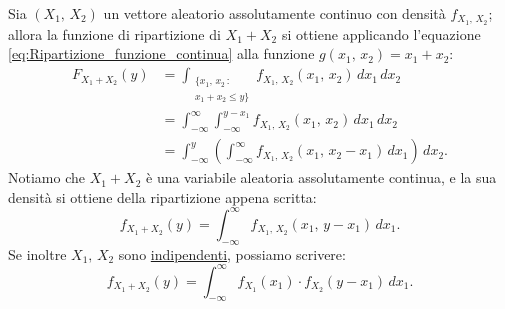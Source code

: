         \begin{prty}
            Sia $(X_1,\, X_2)$ un vettore aleatorio assolutamente continuo con densità $f_{X_1,\,X_2}$; allora la funzione di ripartizione di $X_1 + X_2$ si ottiene applicando l'equazione \eqref{eq:Ripartizione_funzione_continua} alla funzione $g(x_1,\, x_2)=x_1+x_2$:
            \begin{align*}
                F_{X_1+X_2}(y) &= \int_{\substack{\{x_1,\,x_2\,:\\
                x_1+x_2 \leq y\}}} f_{X_1,\,X_2}(x_1,\,x_2)\, dx_1\, dx_2 \\
                               &= \int_{-\infty}^{\infty} \int_{-\infty}^{y-x_1} f_{X_1,\,X_2}(x_1,\,x_2)\,dx_1\, dx_2 \\
                               &= \int_{-\infty}^{y} \left(\int_{-\infty}^{\infty} f_{X_1,\,X_2}(x_1,\,x_2 - x_1)\, dx_1\right)\, dx_2
            .\end{align*}
            Notiamo che $X_1+X_2$ è una variabile aleatoria assolutamente continua, e la sua densità si ottiene della ripartizione appena scritta: \[
                f_{X_1+X_2}(y) = \int_{-\infty}^{\infty} f_{X_1,\,X_2}(x_1,\, y-x_1)\, dx_1
            .\] Se inoltre $X_1,\,X_2$ sono \underline{indipendenti}, possiamo scrivere:
            \begin{equation}\label{eq:Somma_variabili_aleatorie_continue}
                f_{X_1+X_2}(y) = \int_{-\infty}^{\infty} f_{X_1}(x_1)\cdot f_{X_2}(y-x_1)\, dx_1
            .\end{equation}
        \end{prty}
